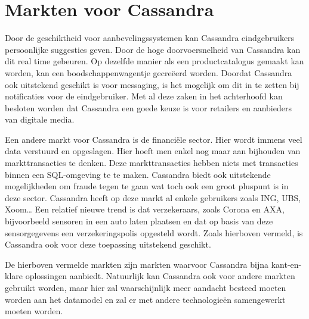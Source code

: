 \section{Markten voor Cassandra}
Door de geschiktheid voor aanbevelingssystemen kan Cassandra eindgebruikers persoonlijke suggesties geven.
Door de hoge doorvoersnelheid van Cassandra kan dit real time gebeuren.
Op dezelfde manier als een productcatalogus gemaakt kan worden, kan een boodschappenwagentje gecreëerd worden.
Doordat Cassandra ook uitstekend geschikt is voor messaging, is het mogelijk om dit in te zetten bij notificaties voor de eindgebruiker.
Met al deze zaken in het achterhoofd kan besloten worden dat Cassandra een goede keuze is voor retailers en aanbieders van digitale media.

Een andere markt voor Cassandra is de financiële sector.
Hier wordt immens veel data verstuurd en opgeslagen.
Hier hoeft men enkel nog maar aan bijhouden van markttransacties te denken.
Deze markttransacties hebben niets met transacties binnen een SQL-omgeving te te maken.
Cassandra biedt ook uitstekende mogelijkheden om fraude tegen te gaan wat toch ook een groot pluspunt is in deze sector.
Cassandra heeft op deze markt al enkele gebruikers zoals ING, UBS, Xoom\dots
Een relatief nieuwe trend is dat verzekeraars, zoals Corona en AXA, bijvoorbeeld sensoren in een auto laten plaatsen en dat op basis van deze sensorgegevens een verzekeringspolis opgesteld wordt.
Zoals hierboven vermeld, is Cassandra ook voor deze toepassing uitstekend geschikt.

De hierboven vermelde markten zijn markten waarvoor Cassandra bijna kant-en-klare oplossingen aanbiedt.
Natuurlijk kan Cassandra ook voor andere markten gebruikt worden, maar hier zal waarschijnlijk meer aandacht besteed moeten worden aan het datamodel en zal er met andere technologieën samengewerkt moeten worden.